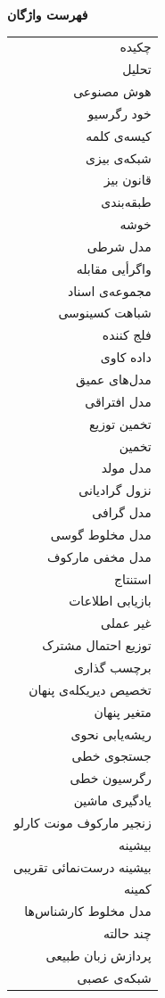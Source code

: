 
\begin{center}
	\textbf{{\LARGE فهرست واژگان}}
\end{center}
\begin{table}[h]
\begin{minipage}{0.5\textwidth}
	\begin{tabular}{r}
	چکیده\\
	تحلیل\\
	هوش مصنوعی\\
	خود رگرسیو\\
	کیسه‌ی کلمه\\
	شبکه‌ی بیزی\\
	قانون بیز\\
	طبقه‌بندی\\
	خوشه\\
	مدل شرطی\\
	واگرأیی مقابله\\
	مجموعه‌ی اسناد\\
	شباهت کسینوسی\\
	فلج کننده\\
	داده کاوی\\
	مدل‌های عمیق\\
	مدل افتراقی\\
	تخمین توزیع\\
	تخمین\\
	مدل مولد\\
	نزول گرادیانی\\
	مدل گرافی\\
	مدل مخلوط گوسی\\
	مدل مخفی‌ مارکوف\\
	استنتاج\\
	بازیابی اطلاعات\\
	غیر عملی\\
	توزیع احتمال مشترک\\
	برچسب گذاری\\
	تخصیص دیریکله‌ی پنهان\\
	متغیر پنهان\\
	ریشه‌یابی‌ نحوی\\
	جستجوی خطی\\
	رگرسیون خطی\\
	یادگیری ماشین\\
	زنجیر مارکوف مونت کارلو\\
	بیشینه\\
	بیشینه درست‌نمائی تقریبی\\
	کمینه\\
	مدل مخلوط کارشناس‌ها\\
	چند حالته\\
	پردازش زبان طبیعی\\
	شبکه‌ی عصبی\\
	

\end{tabular}
\end{minipage}
\end{table}
